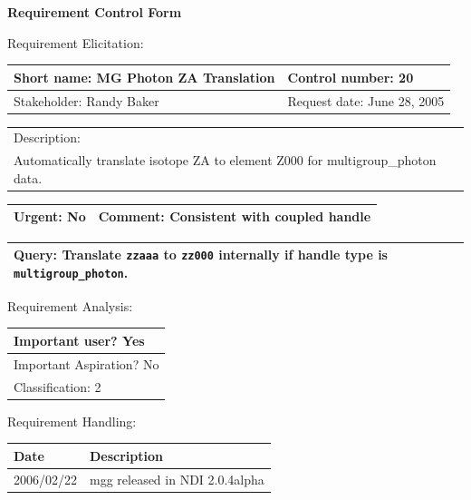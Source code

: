\begin{center}\Large\bf
Requirement Control Form
\end{center}
\vspace{24pt}

Requirement Elicitation:

\begin{tabular}{|p{211pt}|p{211pt}|} \hline
Short name: MG Photon ZA Translation & Control number: 20\\ \hline
Stakeholder: Randy Baker & Request date: June 28, 2005\\
\end{tabular}
\begin{tabular}{|p{433pt}|} \hline
Description: \\ 
Automatically translate isotope ZA to element Z000 for
multigroup\_photon data. \\
\hline
\end{tabular} 
\begin{tabular}{|p{211pt}|p{211pt}|} \hline
Urgent: No & Comment: Consistent with coupled handle\\ \hline
\end{tabular}

\vspace{12pt}

\begin{tabular}{|p{433pt}|} \hline
Query: Translate \texttt{zzaaa} to \texttt{zz000} internally if handle
type is \texttt{multigroup\_photon}. \\ \hline
\end{tabular}
\vspace{24pt}

Requirement Analysis:

\begin{tabular}{|p{433pt}|} \hline
Important user? Yes \\ \hline
Important Aspiration? No \\ \hline
Classification: 2 \\ \hline
\end{tabular}
\vspace{24pt}

Requirement Handling:

\begin{tabular}{|p{72pt}|p{351pt}|} \hline
Date & Description \\ \hline
2006/02/22 & mgg released in NDI 2.0.4alpha \\ \hline 
\end{tabular}
